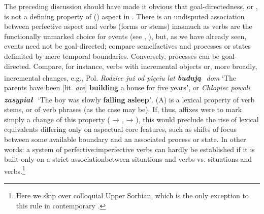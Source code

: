 \documentclass[output=paper]{langsci/langscibook}
\begin{document}
The preceding discussion should have made it obvious that goal-directedness, or , is not a defining property of () aspect in . There is an undisputed association between perfective aspect and  verbs (forms or stems) inasmuch as  verbs are the functionally unmarked choice for  events (see , ), but, as we have already seen, events need not be goal-directed; compare semelfactives and processes or states delimited by mere temporal boundaries. Conversely, processes can be goal-directed. Compare, for instance, verbs with incremental objects or, more broadly, incremental changes, e.g., Pol. \textit{Rodzice już od pięciu lat} \textbf{\textit{budują}}{\textsuperscript{~}\IPFV} \textit{dom} ‘The parents have been [lit. \textit{are}] \textbf{building} a house for five yearsʼ, or \textit{Chłopiec powoli} \textbf{\textit{zasypiał}}{\textsuperscript{~}\IPFV} ‘The boy was slowly \textbf{falling} \textbf{asleep}ʼ. (A) is a lexical property of verb stems, or of verb phrases (as the case may be). If, thus, affixes were to mark simply a change of this property ( → ,  → ), this would preclude the rise of lexical equivalents differing only on aspectual core features, such as shifts of focus between some available boundary and an associated process or state. In other words: a system of per\-fec\-ti\-ve:im\-per\-fec\-ti\-ve verbs can hardly be established if it is built only on a strict association\largerpage[1.5] between  situations and  verbs vs.  situations and  verbs.\footnote{\label{fn:wiemer:4}Here we skip over colloquial Upper Sorbian, which is the only exception to this rule in contemporary  \citep{Breu2000b}.}
\end{document}

